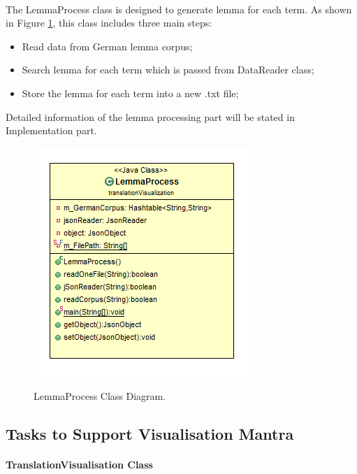 \paragraph[]{}
The LemmaProcess class is designed to generate lemma for each term. As shown in Figure \ref{fig:lemmaProcess}, this class includes three main steps:
\begin{itemize}
	\item \textbf{}Read data from German lemma corpus;
	\item \textbf{}Search lemma for each term which is passed from DataReader class;
	\item \textbf{}Store the lemma for each term into a new .txt file;
\end{itemize} 
Detailed information of the lemma processing part will be stated in Implementation part. 

\begin{figure}[H]
	\centering    
	\includegraphics[scale=0.9]{Figs/LemmaProcess}\\[1ex]
	\caption{LemmaProcess Class Diagram. }
	\label{fig:lemmaProcess}
\end{figure}

\subsection{Tasks to Support Visualisation Mantra}

\paragraph{TranslationVisualisation Class}

